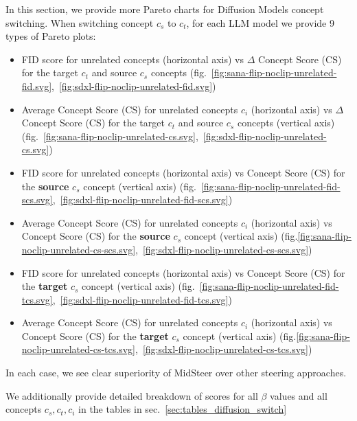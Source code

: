 In this section, we provide more Pareto charts for Diffusion Models concept switching. When switching concept $c_s$ to $c_t$, for each LLM model we provide 9 types of Pareto plots: 
\begin{itemize}
    \item FID score for unrelated concepts (horizontal axis) vs \textbf{$\Delta$} Concept Score (CS) for the target $c_t$ and source $c_s$ concepts (fig.~\ref{fig:sana-flip-noclip-unrelated-fid.svg},~\ref{fig:sdxl-flip-noclip-unrelated-fid.svg})
    \item Average Concept Score (CS) for unrelated concepts $c_i$ (horizontal axis) vs \textbf{$\Delta$} Concept Score (CS) for the target $c_t$ and source $c_s$ concepts (vertical axis)  (fig.~\ref{fig:sana-flip-noclip-unrelated-cs.svg},~\ref{fig:sdxl-flip-noclip-unrelated-cs.svg})
    
    \item FID score for unrelated concepts (horizontal axis) vs Concept Score (CS) for the \textbf{source} $c_s$ concept (vertical axis) (fig.~\ref{fig:sana-flip-noclip-unrelated-fid-scs.svg},~\ref{fig:sdxl-flip-noclip-unrelated-fid-scs.svg})
    \item Average Concept Score (CS) for unrelated concepts $c_i$ (horizontal axis) vs Concept Score (CS) for the \textbf{source} $c_s$ concept (vertical axis) (fig.\ref{fig:sana-flip-noclip-unrelated-cs-scs.svg},~\ref{fig:sdxl-flip-noclip-unrelated-cs-scs.svg})

    \item FID score for unrelated concepts (horizontal axis) vs Concept Score (CS) for the \textbf{target} $c_s$ concept (vertical axis) (fig.~\ref{fig:sana-flip-noclip-unrelated-fid-tcs.svg},~\ref{fig:sdxl-flip-noclip-unrelated-fid-tcs.svg})
    \item Average Concept Score (CS) for unrelated concepts $c_i$ (horizontal axis) vs Concept Score (CS) for the \textbf{target} $c_s$ concept (vertical axis) (fig.\ref{fig:sana-flip-noclip-unrelated-cs-tcs.svg},~\ref{fig:sdxl-flip-noclip-unrelated-cs-tcs.svg})
\end{itemize}

In each case, we see clear superiority of MidSteer over other steering approaches.

We additionally provide detailed breakdown of scores for all $\beta$ values and all concepts $c_s, c_t, c_i$ in the tables in sec.~\ref{sec:tables_diffusion_switch}




